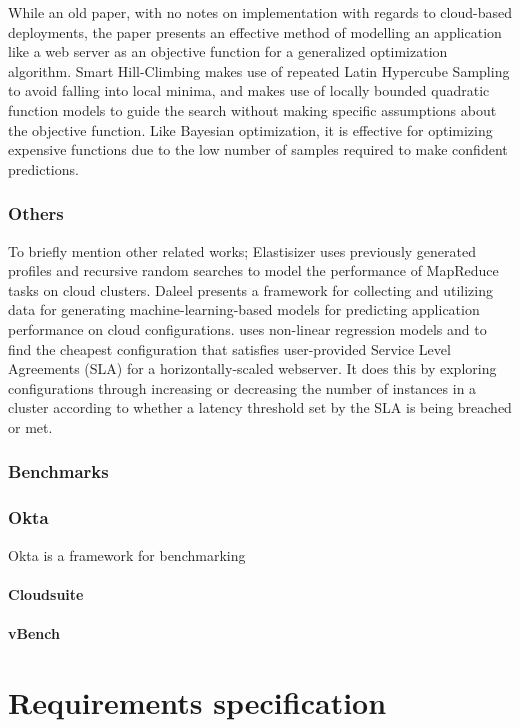 \documentclass{report}
\begin{document}
While an old paper, with no notes on implementation with regards to cloud-based deployments, the paper presents an effective method of modelling an application like a web server as an objective function for a generalized optimization algorithm. Smart Hill-Climbing makes use of repeated Latin Hypercube Sampling to avoid falling into local minima, and makes use of locally bounded quadratic function models to guide the search without making specific assumptions about the objective function. Like Bayesian optimization, it is effective for optimizing expensive functions due to the low number of samples required to make confident predictions. 

\subsection{Others}
To briefly mention other related works; Elastisizer\cite{Herodotou2011} uses previously generated profiles and recursive random searches to model the performance of MapReduce tasks on cloud clusters. Daleel\cite{Samreen} presents a framework for collecting and utilizing data for generating machine-learning-based models for predicting application performance on cloud configurations. \cite{Bodik2009} uses non-linear regression models and to find the cheapest configuration that satisfies user-provided Service Level Agreements (SLA) for a horizontally-scaled webserver. It does this by exploring configurations through increasing or decreasing the number of instances in a cluster according to whether a latency threshold set by the SLA is being breached or met. 

\subsection{Benchmarks}
\subsection{Okta}
Okta \cite{Davatz2017} is a framework for benchmarking 
\subsubsection{Cloudsuite}
\subsubsection{vBench}
\chapter{Requirements specification}
\end{document}
